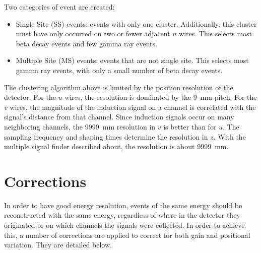 \documentclass[herrin-thesis.tex]{subfiles}
\begin{document}
Two categories of event are created:
\begin{itemize}
\item Single Site (SS) events: events with only one cluster. Additionally, this cluster must have only occurred on two or fewer adjacent \(u\) wires. This selects most beta decay events and few gamma ray events.
\item Multiple Site (MS) events: events that are not single site. This selects most gamma ray events, with only a small number of beta decay events.
\end{itemize}

The clustering algorithm above is limited by the position resolution of the detector. For the \(u\) wires, the resolution is dominated by the \SI{9}{\mm} pitch. For the \(v\) wires, the magnitude of the induction signal on a channel is correlated with the signal's distance from that channel. Since induction signals occur on many neighboring channels, the \SI{9999}{\mm} resolution in \(v\) is better than for \(u\). The sampling frequency and shaping times determine the resolution in \(z\). With the multiple signal finder described about, the resolution is about \SI{9999}{\mm}.

\section{Corrections}
In order to have good energy resolution, events of the same energy should be reconstructed with the same energy, regardless of where in the detector they originated or on which channels the signals were collected. In order to achieve this, a number of corrections are applied to correct for both gain and positional variation. They are detailed below.
\end{document}
